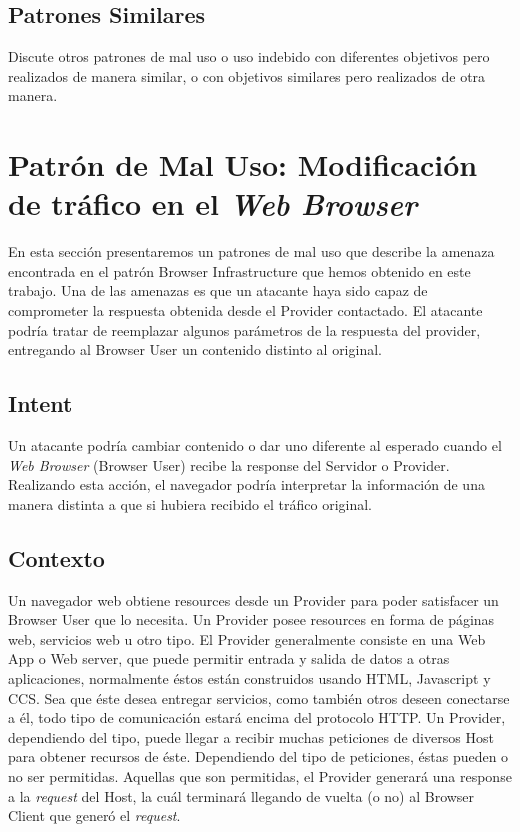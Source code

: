 \subsection*{Patrones Similares}
Discute otros patrones de mal uso o uso indebido con diferentes objetivos pero realizados de manera similar, o con objetivos similares pero realizados de otra manera.


\section{Patrón de Mal Uso: Modificación de tráfico en el \textit{Web Browser}}
En esta sección presentaremos un patrones de mal uso que describe la amenaza encontrada en el patrón Browser Infrastructure que hemos obtenido en este trabajo.
Una de las amenazas es que un atacante haya sido capaz de comprometer la respuesta obtenida desde el Provider contactado. El atacante podría tratar de reemplazar algunos parámetros de la respuesta del provider, entregando al Browser User un contenido distinto al original.

\subsection{Intent}
Un atacante podría cambiar contenido o dar uno diferente al esperado cuando el \textit{Web Browser} (Browser User) recibe la response del Servidor o Provider. Realizando esta acción, el navegador podría interpretar la información de una manera distinta a que si hubiera recibido el tráfico original.

\subsection{Contexto}
Un navegador web obtiene resources desde un Provider para poder satisfacer un Browser User que lo necesita. Un Provider posee resources en forma de páginas web, servicios web u otro tipo. El Provider generalmente consiste en una Web App o Web server, que puede permitir entrada y salida de datos a otras aplicaciones, normalmente éstos están construidos usando HTML, Javascript y CCS. Sea que éste desea entregar servicios, como también otros deseen conectarse a él, todo tipo de comunicación estará encima del protocolo HTTP. Un Provider, dependiendo del tipo, puede llegar a recibir muchas peticiones de diversos Host para obtener recursos de éste. Dependiendo del tipo de peticiones, éstas pueden o no ser permitidas. Aquellas que son permitidas, el Provider generará una response a la \textit{request} del Host, la cuál terminará llegando de vuelta (o no) al Browser Client que generó el \textit{request}.

